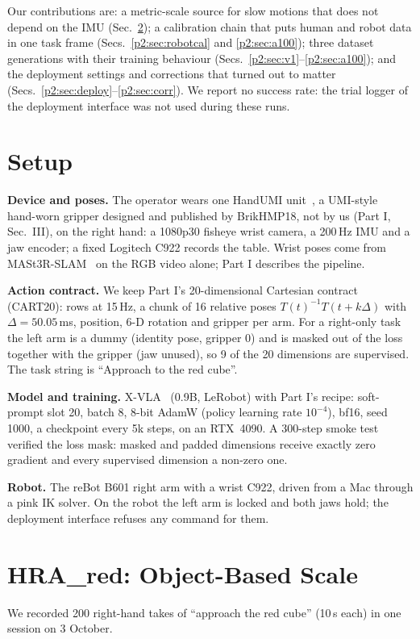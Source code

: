 \documentclass[conference,10pt]{IEEEtran}
\begin{document}
Our contributions are: a metric-scale source for slow motions that does not depend on the IMU (Sec.~\ref{p2:sec:scale}); a
calibration chain that puts human and robot data in one task frame (Secs.~\ref{p2:sec:robotcal} and \ref{p2:sec:a100}); three
dataset generations with their training behaviour (Secs.~\ref{p2:sec:v1}--\ref{p2:sec:a100}); and the deployment settings and
corrections that turned out to matter (Secs.~\ref{p2:sec:deploy}--\ref{p2:sec:corr}). We report no success rate: the trial logger
of the deployment interface was not used during these runs.

\section{Setup}\label{p2:sec:setup}
\textbf{Device and poses.} The operator wears one HandUMI unit~\cite{handumi_hw}, a UMI-style~\cite{chi2024umi} hand-worn gripper designed and published by BrikHMP18, not by us (Part I, Sec.~III), on the right hand: a 1080p30 fisheye wrist
camera, a 200\,Hz IMU and a jaw encoder; a fixed Logitech C922 records the table. Wrist poses come from MASt3R-SLAM~\cite{murai2025mast3rslam} on the RGB
video alone; Part I describes the pipeline.

\textbf{Action contract.} We keep Part I's 20-dimensional Cartesian contract (CART20): rows at 15\,Hz, a chunk of 16 relative
poses $T(t)^{-1}T(t+k\Delta)$ with $\Delta=50.05$\,ms, position, 6-D rotation and gripper per arm. For a right-only task the
left arm is a dummy (identity pose, gripper 0) and is masked out of the loss together with the gripper (jaw unused), so 9 of the
20 dimensions are supervised. The task string is ``Approach to the red cube''.

\textbf{Model and training.} X-VLA~\cite{zheng2025xvla} (0.9B, LeRobot) with Part I's recipe: soft-prompt slot 20, batch 8, 8-bit AdamW (policy
learning rate $10^{-4}$), bf16, seed 1000, a checkpoint every 5k steps, on an RTX~4090. A 300-step smoke test verified the loss
mask: masked and padded dimensions receive exactly zero gradient and every supervised dimension a non-zero one.

\textbf{Robot.} The reBot B601 right arm with a wrist C922, driven from a Mac through a pink IK solver. On the robot the left arm
is locked and both jaws hold; the deployment interface refuses any command for them.

\section{HRA\_red: Object-Based Scale}\label{p2:sec:scale}
We recorded 200 right-hand takes of ``approach the red cube'' (10\,s each) in one session on 3 October.
\end{document}
